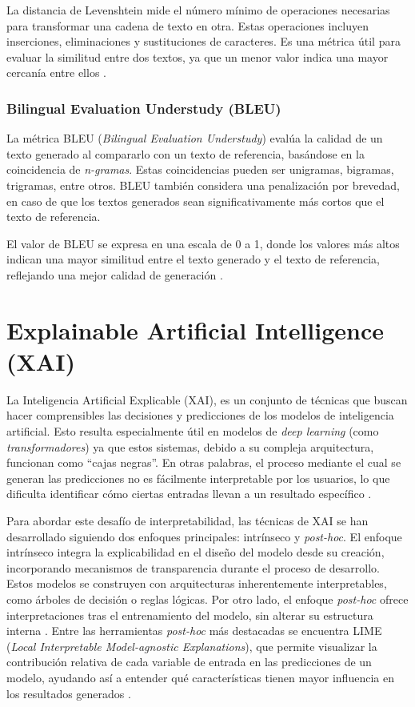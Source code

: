 La distancia de Levenshtein mide el número mínimo de operaciones necesarias para transformar una cadena de texto en otra. Estas operaciones incluyen inserciones, eliminaciones y sustituciones de caracteres. Es una métrica útil para evaluar la similitud entre dos textos, ya que un menor valor indica una mayor cercanía entre ellos \cite{thirtynine}.


\subsubsection{Bilingual Evaluation Understudy (BLEU)}

La métrica BLEU (\textit{Bilingual Evaluation Understudy}) evalúa la calidad de un texto generado al compararlo con un texto de referencia, basándose en la coincidencia de \textit{n-gramas}. Estas coincidencias pueden ser unigramas, bigramas, trigramas, entre otros. BLEU también considera una penalización por brevedad, en caso de que los textos generados sean significativamente más cortos que el texto de referencia.

El valor de BLEU se expresa en una escala de 0 a 1, donde los valores más altos indican una mayor similitud entre el texto generado y el texto de referencia, reflejando una mejor calidad de generación \cite{bleu2001}.




\section{Explainable Artificial Intelligence (XAI)}

La Inteligencia Artificial Explicable (XAI), es un conjunto de técnicas que buscan hacer comprensibles las decisiones y predicciones de los modelos de inteligencia artificial. Esto resulta especialmente útil en modelos de \textit{deep learning} (como \textit{transformadores}) ya que estos sistemas, debido a su compleja arquitectura, funcionan como “cajas negras”. En otras palabras, el proceso mediante el cual se generan las predicciones no es fácilmente interpretable por los usuarios, lo que dificulta identificar cómo ciertas entradas llevan a un resultado específico \cite{doshi2017towards}.

Para abordar este desafío de interpretabilidad, las técnicas de XAI se han desarrollado siguiendo dos enfoques principales: intrínseco y \textit{post-hoc}. El enfoque intrínseco integra la explicabilidad en el diseño del modelo desde su creación, incorporando mecanismos de transparencia durante el proceso de desarrollo. Estos modelos se construyen con arquitecturas inherentemente interpretables, como árboles de decisión o reglas lógicas. Por otro lado, el enfoque \textit{post-hoc} ofrece interpretaciones tras el entrenamiento del modelo, sin alterar su estructura interna \cite{doshi2017towards}. Entre las herramientas \textit{post-hoc} más destacadas se encuentra LIME (\textit{Local Interpretable Model-agnostic Explanations}), que permite visualizar la contribución relativa de cada variable de entrada en las predicciones de un modelo, ayudando así a entender qué características tienen mayor influencia en los resultados generados \cite{dieber2020model}.


